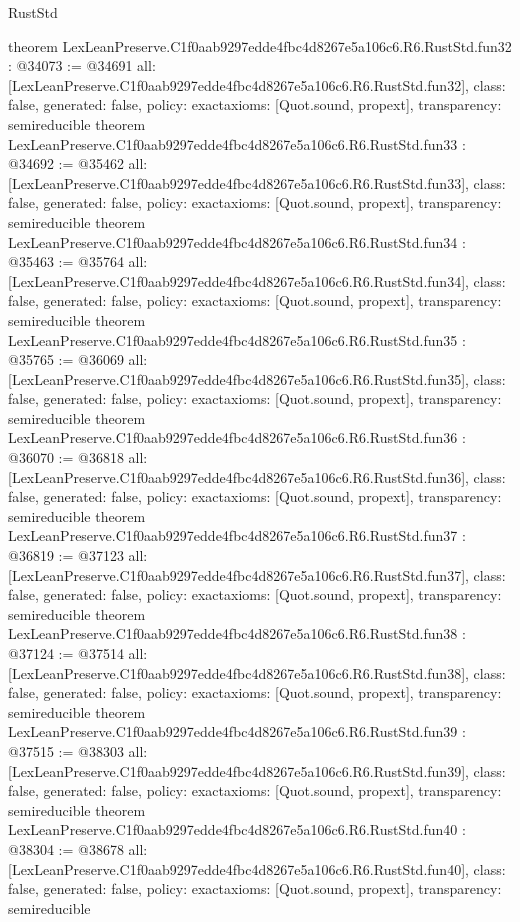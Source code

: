 \begin{lexlean}{RustStd}
\begin{coremodule}
{}
theorem LexLeanPreserve.C1f0aab9297edde4fbc4d8267e5a106c6.R6.RustStd.fun32 : @34073 := @34691 {
  all: [LexLeanPreserve.C1f0aab9297edde4fbc4d8267e5a106c6.R6.RustStd.fun32],
  class: false,
  generated: false,
  policy: exact{axioms: [Quot.sound, propext]},
  transparency: semireducible
}
theorem LexLeanPreserve.C1f0aab9297edde4fbc4d8267e5a106c6.R6.RustStd.fun33 : @34692 := @35462 {
  all: [LexLeanPreserve.C1f0aab9297edde4fbc4d8267e5a106c6.R6.RustStd.fun33],
  class: false,
  generated: false,
  policy: exact{axioms: [Quot.sound, propext]},
  transparency: semireducible
}
theorem LexLeanPreserve.C1f0aab9297edde4fbc4d8267e5a106c6.R6.RustStd.fun34 : @35463 := @35764 {
  all: [LexLeanPreserve.C1f0aab9297edde4fbc4d8267e5a106c6.R6.RustStd.fun34],
  class: false,
  generated: false,
  policy: exact{axioms: [Quot.sound, propext]},
  transparency: semireducible
}
theorem LexLeanPreserve.C1f0aab9297edde4fbc4d8267e5a106c6.R6.RustStd.fun35 : @35765 := @36069 {
  all: [LexLeanPreserve.C1f0aab9297edde4fbc4d8267e5a106c6.R6.RustStd.fun35],
  class: false,
  generated: false,
  policy: exact{axioms: [Quot.sound, propext]},
  transparency: semireducible
}
theorem LexLeanPreserve.C1f0aab9297edde4fbc4d8267e5a106c6.R6.RustStd.fun36 : @36070 := @36818 {
  all: [LexLeanPreserve.C1f0aab9297edde4fbc4d8267e5a106c6.R6.RustStd.fun36],
  class: false,
  generated: false,
  policy: exact{axioms: [Quot.sound, propext]},
  transparency: semireducible
}
theorem LexLeanPreserve.C1f0aab9297edde4fbc4d8267e5a106c6.R6.RustStd.fun37 : @36819 := @37123 {
  all: [LexLeanPreserve.C1f0aab9297edde4fbc4d8267e5a106c6.R6.RustStd.fun37],
  class: false,
  generated: false,
  policy: exact{axioms: [Quot.sound, propext]},
  transparency: semireducible
}
theorem LexLeanPreserve.C1f0aab9297edde4fbc4d8267e5a106c6.R6.RustStd.fun38 : @37124 := @37514 {
  all: [LexLeanPreserve.C1f0aab9297edde4fbc4d8267e5a106c6.R6.RustStd.fun38],
  class: false,
  generated: false,
  policy: exact{axioms: [Quot.sound, propext]},
  transparency: semireducible
}
theorem LexLeanPreserve.C1f0aab9297edde4fbc4d8267e5a106c6.R6.RustStd.fun39 : @37515 := @38303 {
  all: [LexLeanPreserve.C1f0aab9297edde4fbc4d8267e5a106c6.R6.RustStd.fun39],
  class: false,
  generated: false,
  policy: exact{axioms: [Quot.sound, propext]},
  transparency: semireducible
}
theorem LexLeanPreserve.C1f0aab9297edde4fbc4d8267e5a106c6.R6.RustStd.fun40 : @38304 := @38678 {
  all: [LexLeanPreserve.C1f0aab9297edde4fbc4d8267e5a106c6.R6.RustStd.fun40],
  class: false,
  generated: false,
  policy: exact{axioms: [Quot.sound, propext]},
  transparency: semireducible
}
\end{coremodule}
\end{lexlean}
